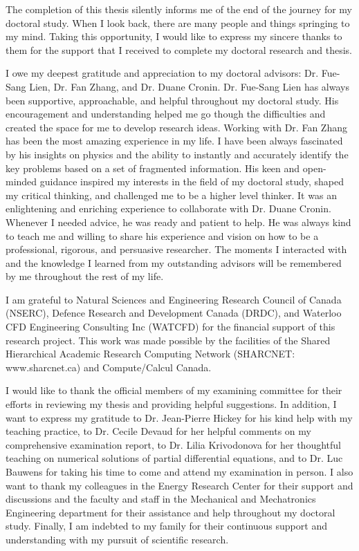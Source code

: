 \begin{acknowledgements}

    The completion of this thesis silently informs me of the end of the journey for my doctoral study. When I look back, there are many people and things springing to my mind. Taking this opportunity, I would like to express my sincere thanks to them for the support that I received to complete my doctoral research and thesis.

    I owe my deepest gratitude and appreciation to my doctoral advisors: Dr. Fue-Sang Lien, Dr. Fan Zhang, and Dr. Duane Cronin. Dr. Fue-Sang Lien has always been supportive, approachable, and helpful throughout my doctoral study. His encouragement and understanding helped me go though the difficulties and created the space for me to develop research ideas. Working with Dr. Fan Zhang has been the most amazing experience in my life. I have been always fascinated by his insights on physics and the ability to instantly and accurately identify the key problems based on a set of fragmented information. His keen and open-minded guidance inspired my interests in the field of my doctoral study, shaped my critical thinking, and challenged me to be a higher level thinker. It was an enlightening and enriching experience to collaborate with Dr. Duane Cronin. Whenever I needed advice, he was ready and patient to help. He was always kind to teach me and willing to share his experience and vision on how to be a professional, rigorous, and persuasive researcher. The moments I interacted with and the knowledge I learned from my outstanding advisors will be remembered by me throughout the rest of my life.

    I am grateful to Natural Sciences and Engineering Research Council of Canada (NSERC), Defence Research and Development Canada (DRDC), and Waterloo CFD Engineering Consulting Inc (WATCFD) for the financial support of this research project. This work was made possible by the facilities of the Shared Hierarchical Academic Research Computing Network (SHARCNET: www.sharcnet.ca) and Compute/Calcul Canada.

    I would like to thank the official members of my examining committee for their efforts in reviewing my thesis and providing helpful suggestions. In addition, I want to express my gratitude to Dr. Jean-Pierre Hickey for his kind help with my teaching practice, to Dr. Cecile Devaud for her helpful comments on my comprehensive examination report, to Dr. Lilia Krivodonova for her thoughtful teaching on numerical solutions of partial differential equations, and to Dr. Luc Bauwens for taking his time to come and attend my examination in person. I also want to thank my colleagues in the Energy Research Center for their support and discussions and the faculty and staff in the Mechanical and Mechatronics Engineering department for their assistance and help throughout my doctoral study. Finally, I am indebted to my family for their continuous support and understanding with my pursuit of scientific research.

\end{acknowledgements}
